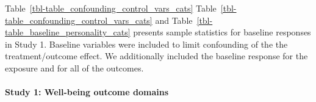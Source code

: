 \documentclass[
  singlecolumn,
  9pt]{article}
\let\oldparagraph\paragraph
\renewcommand{\paragraph}[1]{\oldparagraph{#1}\mbox{}}
\begin{document}
\begin{table}

\caption{\label{tbl-table\_baseline\_personality\_cats}Personality
variables for cat ownership study}


\end{table}%

Table~\ref{tbl-table_confounding_control_vars_cats}
Table~\ref{tbl-table_confounding_control_vars_cats} and
Table~\ref{tbl-table_baseline_personality_cats} presents sample
statistics for baseline responses in Study 1. Baseline variables were
included to limit confounding of the the treatment/outcome effect. We
additionally included the baseline response for the exposure and for all
of the outcomes.

\paragraph{Study 1: Well-being outcome
domains}\label{study-1-well-being-outcome-domains}
\end{document}
